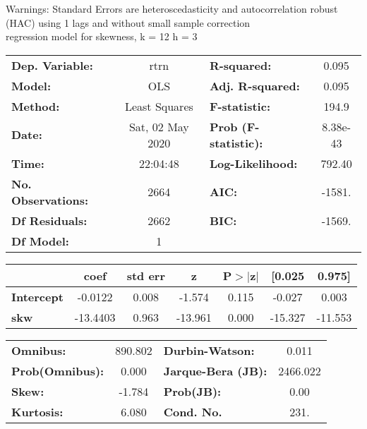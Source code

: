 Warnings: \newline
 [1] Standard Errors are heteroscedasticity and autocorrelation robust (HAC) using 1 lags and without small sample correction\\ 

regression model for skewness, k = 12 h = 3\begin{center}
\begin{tabular}{lclc}
\toprule
\textbf{Dep. Variable:}    &       rtrn       & \textbf{  R-squared:         } &     0.095   \\
\textbf{Model:}            &       OLS        & \textbf{  Adj. R-squared:    } &     0.095   \\
\textbf{Method:}           &  Least Squares   & \textbf{  F-statistic:       } &     194.9   \\
\textbf{Date:}             & Sat, 02 May 2020 & \textbf{  Prob (F-statistic):} &  8.38e-43   \\
\textbf{Time:}             &     22:04:48     & \textbf{  Log-Likelihood:    } &    792.40   \\
\textbf{No. Observations:} &        2664      & \textbf{  AIC:               } &    -1581.   \\
\textbf{Df Residuals:}     &        2662      & \textbf{  BIC:               } &    -1569.   \\
\textbf{Df Model:}         &           1      & \textbf{                     } &             \\
\bottomrule
\end{tabular}
\begin{tabular}{lcccccc}
                   & \textbf{coef} & \textbf{std err} & \textbf{z} & \textbf{P$> |$z$|$} & \textbf{[0.025} & \textbf{0.975]}  \\
\midrule
\textbf{Intercept} &      -0.0122  &        0.008     &    -1.574  &         0.115        &       -0.027    &        0.003     \\
\textbf{skw}       &     -13.4403  &        0.963     &   -13.961  &         0.000        &      -15.327    &      -11.553     \\
\bottomrule
\end{tabular}
\begin{tabular}{lclc}
\textbf{Omnibus:}       & 890.802 & \textbf{  Durbin-Watson:     } &    0.011  \\
\textbf{Prob(Omnibus):} &   0.000 & \textbf{  Jarque-Bera (JB):  } & 2466.022  \\
\textbf{Skew:}          &  -1.784 & \textbf{  Prob(JB):          } &     0.00  \\
\textbf{Kurtosis:}      &   6.080 & \textbf{  Cond. No.          } &     231.  \\
\bottomrule
\end{tabular}
\end{center}

